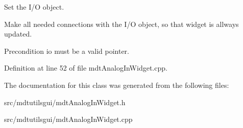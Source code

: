 Set the I/O object. 

Make all needed connections with the I/O object, so that widget is allways updated.

\begin{DoxyPrecond}{Precondition}
io must be a valid pointer. 
\end{DoxyPrecond}


Definition at line 52 of file mdtAnalogInWidget.cpp.



The documentation for this class was generated from the following files:\begin{DoxyCompactItemize}
\item 
src/mdtutilsgui/mdtAnalogInWidget.h\item 
src/mdtutilsgui/mdtAnalogInWidget.cpp\end{DoxyCompactItemize}
